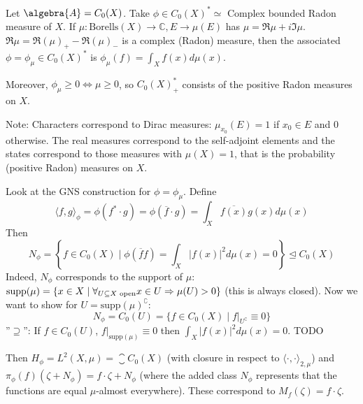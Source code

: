 \documentclass[a4paper]{article}
\begin{document}
\begin{example}
	Let $\algebra{A} = C_0(X)$. Take $\phi \in C_0(X)^* \simeq $ Complex bounded Radon measure of $X$.
		If $\mu: \mathrm{Borells} (X) \to \mathds{C}, E \to \mu(E)$ has $\mu = \Re{\mu} + i \Im{\mu}$.
		$\Re{\mu} = \Re(\mu)_+ - \Re(\mu)_-$ is a complex (Radon) measure, then the associated $\phi = \phi_\mu \in C_0(X)^*$ is $\phi_\mu(f) = \int_X f(x) d\mu(x)$.
		
		Moreover, $\phi_\mu \geq 0 \iff \mu \geq 0$, so $C_0(X)^*_+$ consists of the positive Radon measures on $X$.

		Note: Characters correspond to Dirac measures: $\mu_{x_0}(E) = 1$ if $x_0 \in E$ and $0$ otherwise.	The real measures correspond to the self-adjoint elements and the states correspond to those measures with $\mu(X) = 1$, that is the probability (positive Radon) measures on $X$.
\end{example}

\begin{remark}
	Look at the GNS construction for $\phi = \phi_\mu$. Define
	\begin{equation*}
		\langle f, g\rangle_\phi = \phi(f^* \cdot g) = \phi(\overline{f} \cdot g) = \int_X \overline{f(x)} g(x) d\mu(x)
	\end{equation*}
	Then 
	\begin{equation*}
		N_\phi = \left\{ f \in C_0(X) \mid \phi(\overline{f} f) = \int_X |f(x)|^2 d\mu(x) = 0 \right\} \trianglelefteq C_0(X)
	\end{equation*}
	Indeed, $N_\phi$ corresponds to the support of $\mu$: $\mathrm{supp}(\mu) = \{x \in X \mid \forall_{U \subseteq X \text{ open}} x \in U \Rightarrow \mu(U) > 0 \}$ (this is always closed). Now we want to show for $U = \mathrm{supp}(\mu)^\complement$:
	\begin{equation*}
		N_\phi = C_0(U) = \{ f \in C_0(X) \mid f|_{U^\complement} \equiv 0 \}
	\end{equation*}
	''$\supseteq$'': If $f \in C_0(U)$, $f|_{\mathrm{supp}(\mu)} \equiv 0$ then $\int_X |f(x)|^2 d \mu(x) = 0$. TODO

	
	Then $H_\phi = L^2(X, \mu) = \closure{C_0(X)}$ (with closure in respect to $\langle \cdot, \cdot \rangle_{2, \mu}$) and $\pi_\phi(f)(\zeta + N_\phi) = f \cdot \zeta + N_\phi$ (where the added class $N_\phi$ represents that the functions are equal $\mu$-almost everywhere).
	These correspond to $M_f(\zeta) = f \cdot \zeta$.
\end{remark}
\end{document}
